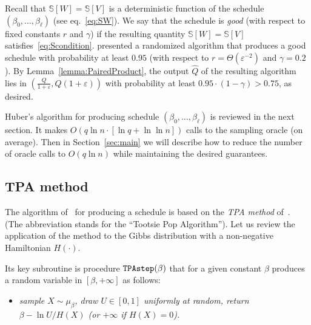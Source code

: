 \documentclass[final,12pt]{colt2018}
\def\Vrel(#1){{{\mathbb S}[{#1}]}}
\begin{document}
Recall that $\Vrel(W)= \Vrel(V)$ is a deterministic function of the schedule $(\beta_0,\ldots,\beta_\ell)$ (see eq.~\eqref{eq:SW}).
We say that the schedule is {\em good} (with respect to fixed constants $r$ and $\gamma$) if the resulting quantity $\Vrel(W)= \Vrel(V)$ satisfies~\eqref{eq:Scondition}.
\cite{Huber:Gibbs} presented  a randomized algorithm that produces a good
schedule with probability at least $0.95$ (with respect to $r=\Theta(\varepsilon^{-2})$ and $\gamma=0.2$).
By Lemma~\ref{lemma:PairedProduct}, the output $\hat Q$ of the resulting algorithm lies in $(\frac{Q}{1+\varepsilon},Q(1+\varepsilon))$
with probability at least $0.95\cdot(1-\gamma)>0.75$, as desired.


Huber's algorithm for producing schedule $(\beta_0,\ldots,\beta_\ell)$
is reviewed in the next section.
It makes  $O(q\ln n\cdot [\ln q + \ln \ln n])$ calls to the sampling oracle (on average).
Then in Section~\ref{sec:main} we will describe how to reduce the number of oracle calls
to $O(q\ln n)$
while maintaining the desired guarantees.

\subsection{TPA method}
The algorithm of~\cite{Huber:Gibbs} for producing a schedule is based on the {\em TPA method} of~\cite{TPA,TPA:journal}.
(The abbreviation stands for the ``Tootsie Pop Algorithm''). Let us review the application of the method
to the Gibbs distribution with a non-negative Hamiltonian $H(\cdot)$.

Its key subroutine is procedure ${\tt TPAstep}(\beta)$ that for a given constant $\beta$
produces a random variable in $[\beta,+\infty]$ as follows:
\begin{itemize}
\item \em
sample $X\!\sim\!\mu_\beta$, draw $U\in[0,1]$ uniformly at random, return $\beta-\ln U/H(X)$
(or $+\infty$ if $H(X)\!=\!0$).
\em
\end{itemize}
\end{document}
